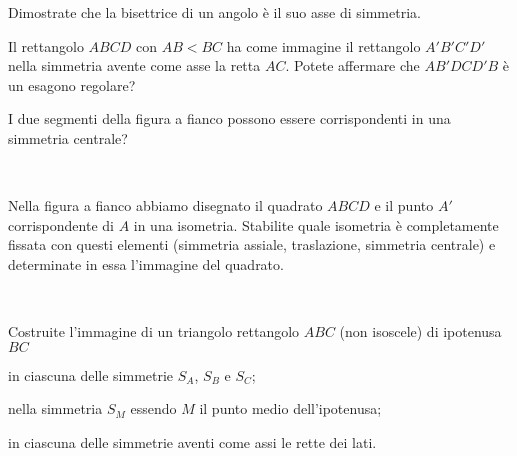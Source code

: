 \begin{esercizio}
\label{ese:8.92} %
Dimostrate che la bisettrice di un angolo è il suo asse di simmetria.
\end{esercizio}

\begin{esercizio}
\label{ese:8.93} %
Il rettangolo $ABCD$ con $AB<BC$ ha come immagine il rettangolo 
$A'B'C'D'$ nella simmetria avente come asse la retta $AC$. Potete 
affermare che $AB'DCD'B$ è un esagono regolare?
\end{esercizio}

\noindent\begin{minipage}{0.75\textwidth}\parindent15pt
\begin{esercizio}
\label{ese:8.94} %
I due segmenti della figura a fianco possono essere corrispondenti in 
una simmetria centrale? 
\end{esercizio}
\end{minipage}\hfil
\begin{minipage}{0.25\textwidth}
	\centering~~
\end{minipage}\vspace{8pt}

\noindent\begin{minipage}{0.65\textwidth}\parindent15pt
\begin{esercizio}
\label{ese:8.95} %
Nella figura a fianco abbiamo disegnato il quadrato $ABCD$ e il punto 
$A'$ corrispondente di $A$ in una isometria. Stabilite quale 
isometria è completamente fissata con questi elementi (simmetria 
assiale, traslazione, simmetria centrale) e determinate in essa 
l'immagine del quadrato. 
\end{esercizio}
\end{minipage}\hfil
\begin{minipage}{0.35\textwidth}
	\centering~~
\end{minipage}\vspace{8pt}

\begin{esercizio}
\label{ese:8.96} %
Costruite l'immagine di un triangolo rettangolo $ABC$ (non isoscele) 
di ipotenusa $BC$
\begin{enumeratea}
\item in ciascuna delle simmetrie $S_A$, $S_B$ e $S_C$;
\item nella simmetria $S_M$ essendo $M$ il punto medio dell'ipotenusa;
\item in ciascuna delle simmetrie aventi come assi le rette dei lati.
\end{enumeratea}
\end{esercizio}


